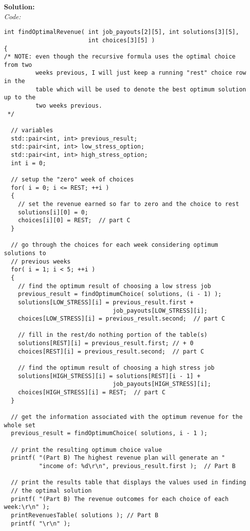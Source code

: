 \documentclass[11pts]{article}
\begin{document}
\begin{enumerate}
\begin{enumerate}
  \textbf{Solution:} \\
  \textit{Code:} \\
  \begin{verbatim}
int findOptimalRevenue( int job_payouts[2][5], int solutions[3][5],
                        int choices[3][5] )
{
/* NOTE: even though the recursive formula uses the optimal choice from two
         weeks previous, I will just keep a running "rest" choice row in the
         table which will be used to denote the best optimum solution up to the
         two weeks previous.
 */

  // variables
  std::pair<int, int> previous_result;
  std::pair<int, int> low_stress_option;
  std::pair<int, int> high_stress_option;
  int i = 0;

  // setup the "zero" week of choices
  for( i = 0; i <= REST; ++i )
  {
    // set the revenue earned so far to zero and the choice to rest
    solutions[i][0] = 0;
    choices[i][0] = REST;  // part C
  }

  // go through the choices for each week considering optimum solutions to
  // previous weeks
  for( i = 1; i < 5; ++i )
  {
    // find the optimum result of choosing a low stress job
    previous_result = findOptimumChoice( solutions, (i - 1) );
    solutions[LOW_STRESS][i] = previous_result.first +
                               job_payouts[LOW_STRESS][i];
    choices[LOW_STRESS][i] = previous_result.second;  // part C

    // fill in the rest/do nothing portion of the table(s)
    solutions[REST][i] = previous_result.first; // + 0
    choices[REST][i] = previous_result.second;  // part C

    // find the optimum result of choosing a high stress job
    solutions[HIGH_STRESS][i] = solutions[REST][i - 1] +
                               job_payouts[HIGH_STRESS][i];
    choices[HIGH_STRESS][i] = REST;  // part C
  }

  // get the information associated with the optimum revenue for the whole set
  previous_result = findOptimumChoice( solutions, i - 1 );

  // print the resulting optimum choice value
  printf( "(Part B) The highest revenue plan will generate an "
          "income of: %d\r\n", previous_result.first );  // Part B

  // print the results table that displays the values used in finding
  // the optimal solution
  printf( "(Part B) The revenue outcomes for each choice of each week:\r\n" );
  printRevenuesTable( solutions ); // Part B
  printf( "\r\n" );


\end{verbatim}
\end{enumerate}
\end{enumerate}
\end{document}
